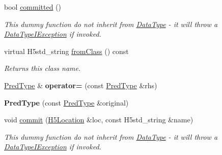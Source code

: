 \begin{DoxyCompactItemize}
\mbox{\label{class_h5_1_1_pred_type_afe9d706998d2be050a9c6f0b2604530a}} 
bool \hyperlink{class_h5_1_1_pred_type_afe9d706998d2be050a9c6f0b2604530a}{committed} ()
\begin{DoxyCompactList}\small\item\em This dummy function do not inherit from \hyperlink{class_h5_1_1_data_type}{Data\+Type} -\/ it will throw a \hyperlink{class_h5_1_1_data_type_i_exception}{Data\+Type\+I\+Exception} if invoked. \end{DoxyCompactList}\item 
\mbox{\label{class_h5_1_1_pred_type_a75af31606c502672b4c55947f11a9632}} 
virtual H5std\+\_\+string \hyperlink{class_h5_1_1_pred_type_a75af31606c502672b4c55947f11a9632}{from\+Class} () const
\begin{DoxyCompactList}\small\item\em Returns this class name. \end{DoxyCompactList}\item 
\mbox{\label{class_h5_1_1_pred_type_a0e4df3713bf26bd68aa87e9a4fc41931}} 
\hyperlink{class_h5_1_1_pred_type}{Pred\+Type} \& {\bfseries operator=} (const \hyperlink{class_h5_1_1_pred_type}{Pred\+Type} \&rhs)
\item 
\mbox{\label{class_h5_1_1_pred_type_add6fc02da90b4237c83ff67ccdab20a4}} 
{\bfseries Pred\+Type} (const \hyperlink{class_h5_1_1_pred_type}{Pred\+Type} \&original)
\item 
\mbox{\label{class_h5_1_1_pred_type_a91ce8376cef135f4bf385e6f3177f18e}} 
void \hyperlink{class_h5_1_1_pred_type_a91ce8376cef135f4bf385e6f3177f18e}{commit} (\hyperlink{class_h5_1_1_h5_location}{H5\+Location} \&loc, const H5std\+\_\+string \&name)
\begin{DoxyCompactList}\small\item\em This dummy function do not inherit from \hyperlink{class_h5_1_1_data_type}{Data\+Type} -\/ it will throw a \hyperlink{class_h5_1_1_data_type_i_exception}{Data\+Type\+I\+Exception} if invoked. \end{DoxyCompactList}\item 
\mbox{\label{class_h5_1_1_pred_type_aeb3180a69dc65f7624035a7918f8c6f7}} 

\end{DoxyCompactItemize}
